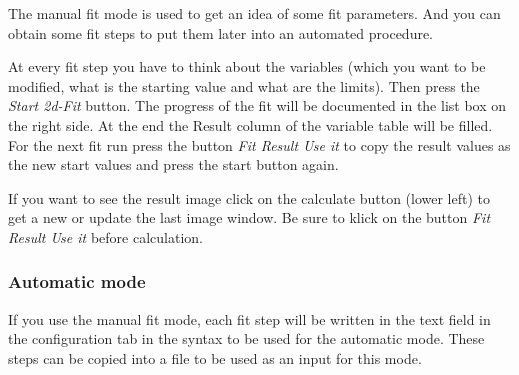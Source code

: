 \documentclass[11pt]{article} %
\begin{document}
The manual fit mode is used to get an idea of some fit parameters. And you can obtain some fit steps to put them later into an automated procedure.

At every fit step you have to think about the variables (which you want to be modified, what is the starting value and what are the limits). Then press the {\it Start 2d-Fit} button. The progress of the fit will be documented in the list box on the right side. At the end the Result column of the variable table will be filled. For the next fit run press the button {\it Fit Result Use it} to copy the result values as the new start values and press the start button again.

If you want to see the result image click on the calculate button (lower left) to get a new or update the last image window. Be sure to klick on the button {\it Fit Result Use it} before calculation.

\subsubsection{Automatic mode}

If you use the manual fit mode, each fit step will be written in the text field in the configuration tab in the syntax to be used for the automatic mode. These steps can be copied into a file to be used as an input for this mode.
\end{document}

